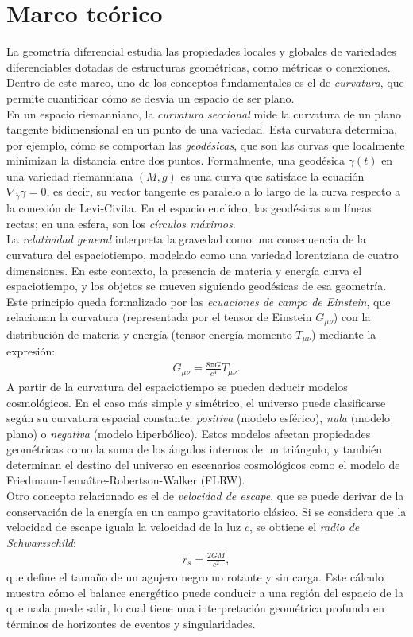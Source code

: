 \documentclass{aleph-revista}
\begin{document}
\section{Marco teórico}
La geometría diferencial estudia las propiedades locales y globales de variedades diferenciables dotadas de estructuras geométricas, como métricas o conexiones. Dentro de este marco, uno de los conceptos fundamentales es el de \textit{curvatura}, que permite cuantificar cómo se desvía un espacio de ser plano.\\
En un espacio riemanniano, la \textit{curvatura seccional} mide la curvatura de un plano tangente bidimensional en un punto de una variedad. Esta curvatura determina, por ejemplo, cómo se comportan las \textit{geodésicas}, que son las curvas que localmente minimizan la distancia entre dos puntos. Formalmente, una geodésica $\gamma(t)$ en una variedad riemanniana $(M,g)$ es una curva que satisface la ecuación $\nabla_{\dot{\gamma}}\dot{\gamma} = 0$, es decir, su vector tangente es paralelo a lo largo de la curva respecto a la conexión de Levi-Civita. En el espacio euclídeo, las geodésicas son líneas rectas; en una esfera, son los \textit{círculos máximos}.\\
La \textit{relatividad general} interpreta la gravedad como una consecuencia de la curvatura del espaciotiempo, modelado como una variedad lorentziana de cuatro dimensiones. En este contexto, la presencia de materia y energía curva el espaciotiempo, y los objetos se mueven siguiendo geodésicas de esa geometría. Este principio queda formalizado por las \textit{ecuaciones de campo de Einstein}, que relacionan la curvatura (representada por el tensor de Einstein $G_{\mu\nu}$) con la distribución de materia y energía (tensor energía-momento $T_{\mu\nu}$) mediante la expresión:
\begin{align*}
  G_{\mu\nu} = \frac{8\pi G}{c^4} T_{\mu\nu}. 
\end{align*}
A partir de la curvatura del espaciotiempo se pueden deducir modelos cosmológicos. En el caso más simple y simétrico, el universo puede clasificarse según su curvatura espacial constante: \textit{positiva} (modelo esférico), \textit{nula} (modelo plano) o \textit{negativa} (modelo hiperbólico). Estos modelos afectan propiedades geométricas como la suma de los ángulos internos de un triángulo, y también determinan el destino del universo en escenarios cosmológicos como el modelo de Friedmann-Lemaître-Robertson-Walker (FLRW).\\
Otro concepto relacionado es el de \textit{velocidad de escape}, que se puede derivar de la conservación de la energía en un campo gravitatorio clásico. Si se considera que la velocidad de escape iguala la velocidad de la luz $c$, se obtiene el \textit{radio de Schwarzschild}:
\begin{align*}
  r_s = \frac{2GM}{c^2}, 
\end{align*}
que define el tamaño de un agujero negro no rotante y sin carga. Este cálculo muestra cómo el balance energético puede conducir a una región del espacio de la que nada puede salir, lo cual tiene una interpretación geométrica profunda en términos de horizontes de eventos y singularidades.
\end{document}
